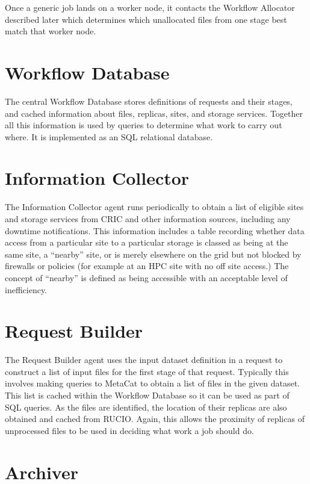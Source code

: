 \documentclass[../main-v1.tex]{subfiles}
\begin{document}
Once a generic job lands on a worker node, it contacts the Workflow Allocator described later which determines which unallocated files from one stage best match that worker node.

\section{Workflow Database}
\label{sec:flow:wfdb}

The central Workflow Database stores definitions of requests and their stages, and cached information about files, replicas, sites, and storage services. Together all this information is used by queries to determine what work to carry out where. It is implemented as an SQL relational database.

\section{Information Collector}
\label{sec:flow:collector}

The Information Collector agent runs periodically to obtain a list of eligible sites and storage services from CRIC and other information sources, including any downtime notifications. This information includes a table recording whether data access from a particular site to a particular storage is classed as being at the same site, a ``nearby'' site, or is merely elsewhere on the grid but not blocked by firewalls or policies (for example at an HPC site with no off site access.) The concept of ``nearby'' is defined as being accessible with an acceptable level of inefficiency.

\section{Request Builder}
\label{sec:flow:builder}

The Request Builder agent uses the input dataset definition in a request to construct a list of input files for the first stage of that request. Typically this involves making queries to MetaCat to obtain a list of files in the given dataset. This list is cached within the Workflow Database so it can be used as part of SQL queries. As the files are identified, the location of their replicas are also obtained and cached from RUCIO. Again, this allows the proximity of replicas of unprocessed files to be used in deciding what work a job should do.

\section{Archiver}
\label{sec:flow:archiver}
\end{document}
